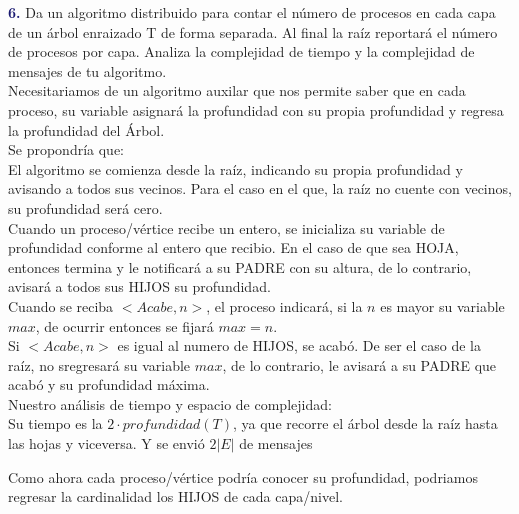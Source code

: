 \newpage
\textbf{\textcolor{MidnightBlue}{6.}}
Da un algoritmo distribuido para contar el
número de procesos en cada capa de un árbol
enraizado T de forma separada. Al final la
raíz reportará el número de procesos por capa.
Analiza la complejidad de tiempo y la complejidad
de mensajes de tu algoritmo.\\

Necesitariamos de un algoritmo auxilar que nos permite saber que en cada proceso,
su variable asignará la profundidad con su propia profundidad y regresa la
profundidad del Árbol.\\

Se propondría que:\\
El algoritmo se comienza desde la raíz, indicando su propia profundidad y
avisando a todos sus vecinos. Para el caso en el que, la raíz no cuente con
vecinos, su profundidad será cero.\\

Cuando un proceso/vértice recibe un entero, se inicializa su variable de profundidad
conforme al entero que recibio. En el caso de que sea HOJA, entonces termina y
le notificará a su PADRE con su altura, de lo contrario, avisará a todos sus
HIJOS su profundidad.\\

Cuando se reciba $<Acabe, n>$, el proceso indicará, si la $n$ es mayor su
variable $max$, de ocurrir entonces se fijará $max=n$.\\

Si $<Acabe, n>$ es igual al numero de HIJOS, se acabó. De ser el caso de la
raíz, no sregresará su variable $max$, de lo contrario, le avisará a su PADRE
que acabó y su profundidad máxima.\\

Nuestro análisis de tiempo y espacio de complejidad:\\
Su tiempo es la $2\cdot profundidad(T)$, ya que recorre el árbol desde la raíz
hasta las hojas y viceversa. Y se envió $2|E|$ de mensajes

Como ahora cada proceso/vértice podría conocer su profundidad, podriamos
regresar la cardinalidad los HIJOS de cada capa/nivel.\\

